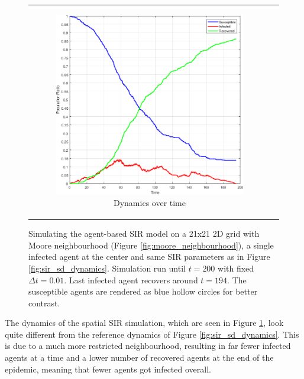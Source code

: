 \begin{figure}
\begin{center}
\begin{tabular}{c c}
		\begin{subfigure}[b]{0.43\textwidth}
			\centering
			\includegraphics[width=1\textwidth, angle=0]{./fig/timedriven/SIR_Dunai/SIR_Dunai_dt001.png}
			\caption{Dynamics over time}
			\label{fig:sir_dunai_env_dynamics}
		\end{subfigure}
	\end{tabular}
	
	\caption{Simulating the agent-based SIR model on a 21x21 2D grid with Moore neighbourhood (Figure \ref{fig:moore_neighbourhood}), a single infected agent at the center and same SIR parameters as in Figure \ref{fig:sir_sd_dynamics}. Simulation run until $t = 200$ with fixed $\Delta t = 0.01$. Last infected agent recovers around $t = 194$. The susceptible agents are rendered as blue hollow circles for better contrast.}
	\label{fig:sir_dunai}
\end{center}
\end{figure}

The dynamics of the spatial SIR simulation, which are seen in Figure \ref{fig:sir_dunai_env_dynamics}, look quite different from the reference dynamics of Figure \ref{fig:sir_sd_dynamics}. This is due to a much more restricted neighbourhood, resulting in far fewer infected agents at a time and a lower number of recovered agents at the end of the epidemic, meaning that fewer agents got infected overall.

